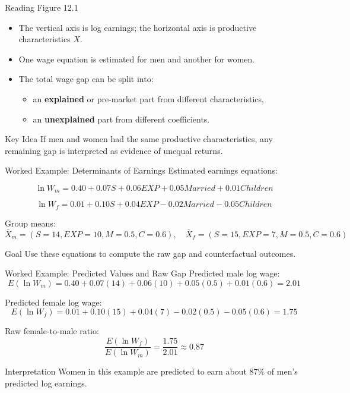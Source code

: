 \documentclass[aspectratio=169]{beamer}
\begin{document}
\begin{frame}{Reading Figure 12.1}
\transfade
\begin{itemize}[<+->]
  \item The vertical axis is log earnings; the horizontal axis is productive characteristics \(X\).
  \item One wage equation is estimated for men and another for women.
  \item The total wage gap can be split into:
  \begin{itemize}[<+->]
    \item an \textbf{explained} or pre-market part from different characteristics,
    \item an \textbf{unexplained} part from different coefficients.
  \end{itemize}
\end{itemize}

\begin{block}{Key Idea}
If men and women had the same productive characteristics, any remaining gap is interpreted as evidence of unequal returns.
\end{block}
\end{frame}

\begin{frame}{Worked Example: Determinants of Earnings}
\transfade
Estimated earnings equations:

\[
\ln W_m = 0.40 + 0.07S + 0.06EXP + 0.05Married + 0.01Children
\]

\[
\ln W_f = 0.01 + 0.10S + 0.04EXP - 0.02Married - 0.05Children
\]

Group means:
\[
\bar X_m = (S=14, EXP=10, M=0.5, C=0.6), \quad
\bar X_f = (S=15, EXP=7, M=0.5, C=0.6)
\]

\begin{block}{Goal}
Use these equations to compute the raw gap and counterfactual outcomes.
\end{block}
\end{frame}

\begin{frame}{Worked Example: Predicted Values and Raw Gap}
\transfade
Predicted male log wage:
\[
E(\ln W_m)=0.40+0.07(14)+0.06(10)+0.05(0.5)+0.01(0.6)=2.01
\]

Predicted female log wage:
\[
E(\ln W_f)=0.01+0.10(15)+0.04(7)-0.02(0.5)-0.05(0.6)=1.75
\]

Raw female-to-male ratio:
\[
\frac{E(\ln W_f)}{E(\ln W_m)}=\frac{1.75}{2.01}\approx 0.87
\]

\begin{block}{Interpretation}
Women in this example are predicted to earn about 87\% of men's predicted log earnings.
\end{block}
\end{frame}
\end{document}
